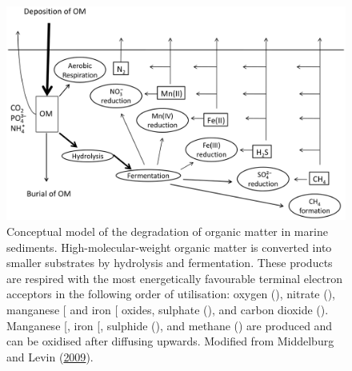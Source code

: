 \documentclass[
  12 pt,
]{book}
\begin{document}
\begin{figure}[ht]

{\centering \includegraphics[width=0.9\linewidth]{figures/middelburg2009} 

}

\caption{Conceptual model of the degradation of organic matter in marine sediments. High-molecular-weight organic matter is converted into smaller substrates by hydrolysis and fermentation. These products are respired with the most energetically favourable terminal electron acceptors in the following order of utilisation: oxygen (), nitrate (), manganese {[}\ch{Mn({IV})}{]} and iron {[}\ch{Fe({III})}{]} oxides, sulphate (), and carbon dioxide (). Manganese {[}\ch{Mn({II})}{]}, iron {[}\ch{Fe({II})}{]}, sulphide (), and methane () are produced and can be oxidised after diffusing upwards. Modified from Middelburg and Levin (\protect\hyperlink{ref-Middelburg2009}{2009}).}\label{fig:middelburg2009}
\end{figure}
\end{document}
